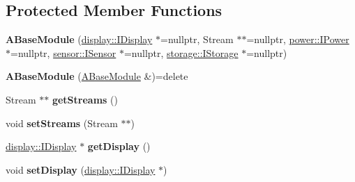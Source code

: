 \subsection*{Protected Member Functions}
\begin{DoxyCompactItemize}
\item 
\mbox{\label{classwood_box_1_1module_1_1_a_base_module_a40edd799ba7342abfaf5cb06e60a4b04}} 
{\bfseries A\+Base\+Module} (\mbox{\hyperlink{classwood_box_1_1display_1_1_i_display}{display\+::\+I\+Display}} $\ast$=nullptr, Stream $\ast$$\ast$=nullptr, \mbox{\hyperlink{classwood_box_1_1power_1_1_i_power}{power\+::\+I\+Power}} $\ast$=nullptr, \mbox{\hyperlink{classwood_box_1_1sensor_1_1_i_sensor}{sensor\+::\+I\+Sensor}} $\ast$=nullptr, \mbox{\hyperlink{classwood_box_1_1storage_1_1_i_storage}{storage\+::\+I\+Storage}} $\ast$=nullptr)
\item 
\mbox{\label{classwood_box_1_1module_1_1_a_base_module_a2ba8fdaace63960a0696b77bee60b64b}} 
{\bfseries A\+Base\+Module} (\mbox{\hyperlink{classwood_box_1_1module_1_1_a_base_module}{A\+Base\+Module}} \&)=delete
\item 
\mbox{\label{classwood_box_1_1module_1_1_a_base_module_ada9df5e73cb0aee0bada1de17de19a9c}} 
Stream $\ast$$\ast$ {\bfseries get\+Streams} ()
\item 
\mbox{\label{classwood_box_1_1module_1_1_a_base_module_a6e3b73bd36f668f5d621dee3070c131a}} 
void {\bfseries set\+Streams} (Stream $\ast$$\ast$)
\item 
\mbox{\label{classwood_box_1_1module_1_1_a_base_module_afecd89a2ed85517a6d72ad2f03ea87c3}} 
\mbox{\hyperlink{classwood_box_1_1display_1_1_i_display}{display\+::\+I\+Display}} $\ast$ {\bfseries get\+Display} ()
\item 
\mbox{\label{classwood_box_1_1module_1_1_a_base_module_a7e99b7d8d59953a8350e9859a475bc6a}} 
void {\bfseries set\+Display} (\mbox{\hyperlink{classwood_box_1_1display_1_1_i_display}{display\+::\+I\+Display}} $\ast$)
\item 
\mbox{\label{classwood_box_1_1module_1_1_a_base_module_a6a0c195b7c497201926f6d07b77f6489}} 
$$
\end{DoxyCompactItemize}
